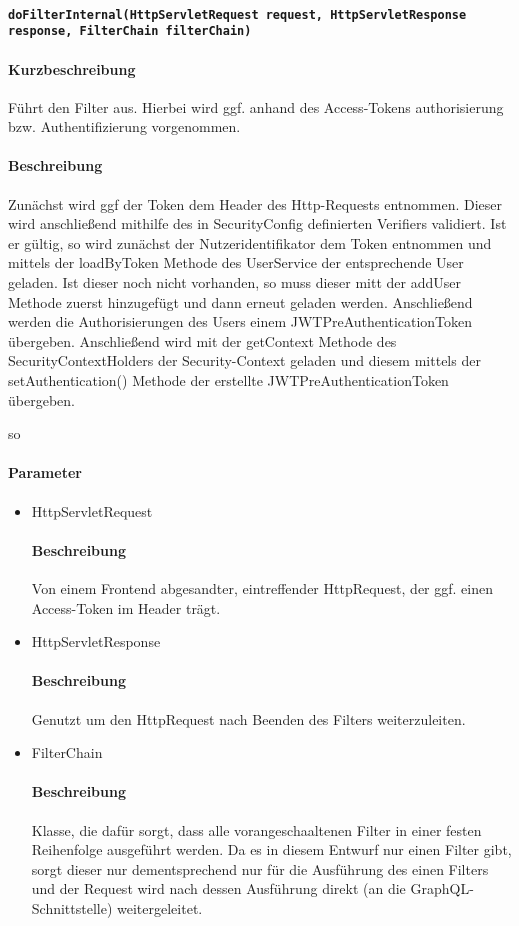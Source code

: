 \paragraph{\texttt{doFilterInternal(HttpServletRequest request, HttpServletResponse response, FilterChain filterChain)}}%
\paragraph*{Kurzbeschreibung}
Führt den Filter aus. Hierbei wird ggf. anhand des Access-Tokens authorisierung bzw. Authentifizierung vorgenommen.
\paragraph*{Beschreibung}
Zunächst wird ggf der Token dem Header des Http-Requests entnommen. Dieser wird anschließend mithilfe des in
\dq SecurityConfig \dq definierten Verifiers validiert. Ist er gültig, so wird zunächst der Nutzeridentifikator dem Token entnommen und mittels der \dq loadByToken \dq Methode 
des UserService der entsprechende User geladen. Ist dieser noch nicht vorhanden, so muss dieser mitt der \dq addUser \dq Methode
zuerst hinzugefügt und dann erneut geladen werden. Anschließend werden die Authorisierungen des Users einem \dq 
JWTPreAuthenticationToken \dq übergeben. Anschließend wird mit der \dq getContext \dq Methode des SecurityContextHolders der 
Security-Context geladen und diesem mittels der \dq setAuthentication() \dq Methode der erstellte JWTPreAuthenticationToken 
übergeben. 

so
\paragraph*{Parameter}
\begin{itemize}
    \item HttpServletRequest
    		\paragraph*{Beschreibung}
            Von einem Frontend abgesandter, eintreffender HttpRequest, der ggf. einen Access-Token im Header trägt.
    \item HttpServletResponse
        	\paragraph*{Beschreibung}
            Genutzt um den HttpRequest nach Beenden des Filters weiterzuleiten.
    \item FilterChain
    		\paragraph*{Beschreibung}
            Klasse, die dafür sorgt, dass alle vorangeschaaltenen Filter in einer festen Reihenfolge ausgeführt werden. Da es in diesem Entwurf nur einen Filter gibt,
            sorgt dieser nur dementsprechend nur für die Ausführung des einen Filters und der Request wird nach dessen Ausführung direkt (an die GraphQL-Schnittstelle) weitergeleitet.

\end{itemize}